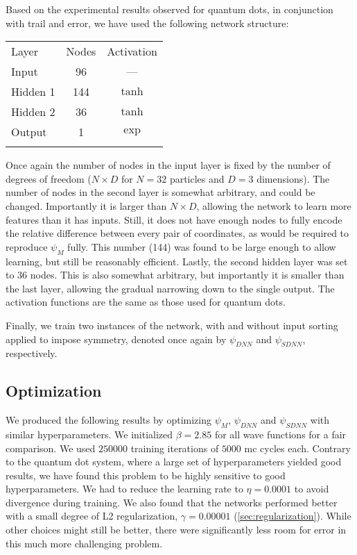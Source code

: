 \documentclass[Thesis.tex]{subfiles}
\begin{document}
Based on the experimental results observed for quantum dots, in conjunction with
trail and error, we have used the following network structure:

\begin{center}
  \begin{tabular}{lcc}
    \toprule
    \addlinespace
    Layer & Nodes & Activation\\
    \addlinespace
    \midrule
    \addlinespace
    \addlinespace
    Input & 96 & ---\\
    Hidden 1& 144 & $\tanh$\\
    Hidden 2& 36 & $\tanh$\\
    Output & 1 & $\exp$\\
    \addlinespace
    \addlinespace
    \bottomrule
  \end{tabular}
\end{center}
Once again the number of nodes in the input layer is fixed by the
number of degrees of freedom ($N\times D$ for $N=32$ particles and $D=3$ dimensions). The number of
nodes in the second layer is somewhat arbitrary, and could be changed.
Importantly it is larger than $N\times D$, allowing the network to learn more features
than it has inputs. Still, it does not have enough nodes to fully encode the relative
difference between every pair of coordinates, as would be required to reproduce
$\psi_M$ fully. This number (144) was found to be large enough to allow learning, but
still be reasonably efficient. Lastly, the second hidden layer was set to $36$
nodes. This is also somewhat arbitrary, but importantly it is smaller than
the last layer, allowing the gradual narrowing down to the single output. The activation
functions are the same as those used for quantum dots.

Finally, we train two instances of the network, with and without input sorting
applied to impose symmetry, denoted once again by $\psi_{DNN}$ and
$\psi_{SDNN}$, respectively.


\subsection{Optimization}

We produced the following results by optimizing $\psi_M$, $\psi_{DNN}$ and $\psi_{SDNN}$ with
similar hyperparameters. We initialized $\beta=\num{2.85}$ for all wave functions
for a fair comparison. We used $\num{250000}$ training iterations of
$\num{5000}$ \gls{mc} cycles each. Contrary to the quantum dot system, where a large
set of hyperparameters yielded good results, we have found this problem to be
highly sensitive to good hyperparameters. We had to reduce the learning rate to
$\eta=\num{0.0001}$ to avoid divergence during training. We also found that the
networks performed better with a small degree of L2 regularization,
$\gamma=\num{0.00001}$ (\cref{sec:regularization}). While other choices might still be better, there were
significantly less room for error in this much more challenging problem.
\end{document}
